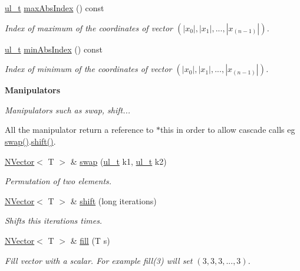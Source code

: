 \begin{Indent}
\begin{DoxyCompactItemize}
\mbox{\hyperlink{typedef_8h_a1b140a2034db3f5dfe18a987745df43a}{ul\+\_\+t}} \mbox{\hyperlink{class_n_vector_ac7d7d39b68956da9018684a3706a70c2}{max\+Abs\+Index}} () const
\begin{DoxyCompactList}\small\item\em Index of maximum of the coordinates of vector $ (|x_0|, |x_1|, ..., |x_{(n-1)}|) $. \end{DoxyCompactList}\item 
\mbox{\hyperlink{typedef_8h_a1b140a2034db3f5dfe18a987745df43a}{ul\+\_\+t}} \mbox{\hyperlink{class_n_vector_a8b9147431ee1f9c5a25c6e0b2f793c40}{min\+Abs\+Index}} () const
\begin{DoxyCompactList}\small\item\em Index of minimum of the coordinates of vector $ (|x_0|, |x_1|, ..., |x_{(n-1)}|) $. \end{DoxyCompactList}\end{DoxyCompactItemize}
\end{Indent}
\begin{Indent}\textbf{ Manipulators}\par
{\em Manipulators such as swap, shift...

All the manipulator return a reference to {\ttfamily $\ast$this} in order to allow cascade calls eg {\ttfamily \mbox{\hyperlink{class_n_vector_a8ea2e2cffa2c3053d835d05a571dac88}{swap()}}.\mbox{\hyperlink{class_n_vector_aabe8585ef2659ce3fa7872c2b96e3b20}{shift()}}}. }\begin{DoxyCompactItemize}
\item 
\mbox{\hyperlink{class_n_vector}{N\+Vector}}$<$ T $>$ \& \mbox{\hyperlink{class_n_vector_a8ea2e2cffa2c3053d835d05a571dac88}{swap}} (\mbox{\hyperlink{typedef_8h_a1b140a2034db3f5dfe18a987745df43a}{ul\+\_\+t}} k1, \mbox{\hyperlink{typedef_8h_a1b140a2034db3f5dfe18a987745df43a}{ul\+\_\+t}} k2)
\begin{DoxyCompactList}\small\item\em Permutation of two elements. \end{DoxyCompactList}\item 
\mbox{\hyperlink{class_n_vector}{N\+Vector}}$<$ T $>$ \& \mbox{\hyperlink{class_n_vector_aabe8585ef2659ce3fa7872c2b96e3b20}{shift}} (long iterations)
\begin{DoxyCompactList}\small\item\em Shifts {\ttfamily this} {\ttfamily iterations} times. \end{DoxyCompactList}\item 
\mbox{\hyperlink{class_n_vector}{N\+Vector}}$<$ T $>$ \& \mbox{\hyperlink{class_n_vector_ae0e51edea3a6e998c5b6ff5336939e90}{fill}} (T s)
\begin{DoxyCompactList}\small\item\em Fill vector with a scalar. For example {\ttfamily fill(3)} will set $ (3, 3, 3, ..., 3) $. \end{DoxyCompactList}\end{DoxyCompactItemize}
\end{Indent}
